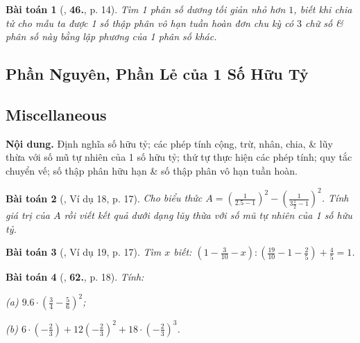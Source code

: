 \documentclass{article}
\numberwithin{equation}{section}
\newtheorem{baitoan}{Bài toán}[section]
\begin{document}
\begin{baitoan}[\cite{Tuyen_Toan_7}, \textbf{46.}, p. 14]
	Tìm 1 phân số dương tối giản nhỏ hơn $1$, biết khi chia tử cho mẫu ta được 1 số thập phân vô hạn tuần hoàn đơn chu kỳ có $3$ chữ số \& phân số này bằng lập phương của 1 phân số khác.
\end{baitoan}


\subsection{Phần Nguyên, Phần Lẻ của 1 Số Hữu Tỷ}


\subsection{Miscellaneous}
\textsf{\textbf{Nội dung.} Định nghĩa số hữu tỷ; các phép tính cộng, trừ, nhân, chia, \& lũy thừa với số mũ tự nhiên của 1 số hữu tỷ; thứ tự thực hiện các phép tính; quy tắc chuyển vế; số thập phân hữu hạn \& số thập phân vô hạn tuần hoàn.}

\begin{baitoan}[\cite{Tuyen_Toan_7}, Ví dụ 18, p. 17]
	Cho biểu thức $A = \left(\frac{1}{2.5  -1}\right)^2 - \left(\frac{1}{3\frac{1}{2} - 1}\right)^2$. Tính giá trị của $A$ rồi viết kết quả dưới dạng lũy thừa với số mũ tự nhiên của 1 số hữu tỷ.
\end{baitoan}

\begin{baitoan}[\cite{Tuyen_Toan_7}, Ví dụ 19, p. 17]
	Tìm $x$ biết: $\left(1 - \frac{3}{10} - x\right):\left(\frac{19}{10} - 1 - \frac{2}{5}\right) + \frac{4}{5} = 1$.
\end{baitoan}

\begin{baitoan}[\cite{Tuyen_Toan_7}, \textbf{62.}, p. 18]
	Tính:
	\begin{enumerate*}
		\item[(a)] $9.6\cdot\left(\frac{3}{4} - \frac{5}{6}\right)^2$;
		\item[(b)] $6\cdot\left(-\frac{2}{3}\right) + 12\left(-\frac{2}{3}\right)^2 + 18\cdot\left(-\frac{2}{3}\right)^3$.
	\end{enumerate*}
\end{baitoan}
\end{document}
